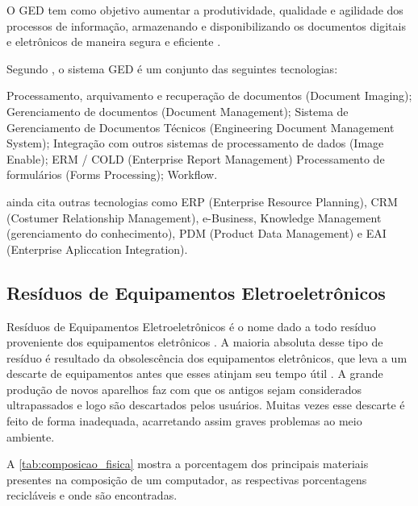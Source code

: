 O GED tem como objetivo aumentar a produtividade, qualidade e agilidade dos processos de informação, armazenando e disponibilizando os documentos digitais e eletrônicos de maneira segura e eficiente \cite{da2003ged}.

Segundo , o sistema GED é um conjunto das seguintes tecnologias:

\begin{citacao}
Processamento, arquivamento e recuperação de documentos (Document Imaging); Gerenciamento de documentos (Document Management); Sistema de Gerenciamento de Documentos Técnicos (Engineering
Document Management System); Integração com outros sistemas de processamento de dados (Image Enable); ERM / COLD (Enterprise Report Management) Processamento de formulários (Forms Processing);
Workflow.
\end{citacao}

 ainda cita outras tecnologias como  ERP (Enterprise Resource Planning), CRM (Costumer Relationship Management), e-Business, Knowledge Management (gerenciamento do conhecimento), PDM (Product Data Management) e EAI (Enterprise Apliccation Integration).


\subsection{Resíduos de Equipamentos Eletroeletrônicos}

Resíduos de Equipamentos Eletroeletrônicos é o nome dado a todo resíduo proveniente dos equipamentos eletrônicos \cite[p. 2]{natume2011residuos}. A maioria absoluta desse tipo de resíduo é resultado da obsolescência dos equipamentos eletrônicos, que leva a um descarte de equipamentos antes que esses atinjam seu tempo útil \cite[p. 2]{da2010lixo}. A grande produção de novos aparelhos faz com que os antigos sejam considerados ultrapassados e logo são descartados pelos usuários. Muitas vezes esse descarte é feito de forma inadequada, acarretando assim graves problemas ao meio ambiente.

A \autoref{tab:composicao_fisica} mostra a porcentagem dos principais materiais presentes na composição de um computador, as respectivas porcentagens recicláveis e onde são encontradas.

